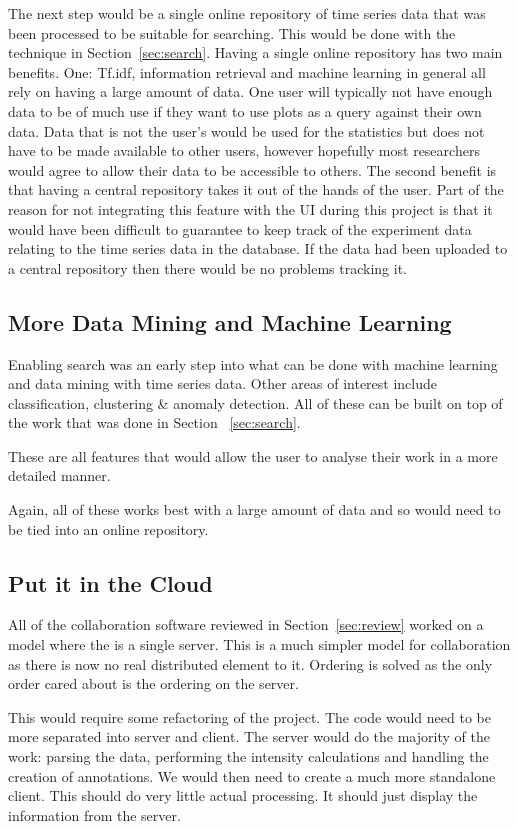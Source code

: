 The next step would be a single online repository of time series data that was been processed to be suitable for searching.  This would be done with the technique in Section~\ref{sec:search}.  Having a single online repository has two main benefits.  One: Tf.idf, information retrieval and machine learning in general all rely on having a large amount of data.  One user will typically not have enough data to be of much use if they want to use plots as a query against their own data.  Data that is not the user's would be used for the statistics but does not have to be made available to other users, however hopefully most researchers would agree to allow their data to be accessible to others.  The second benefit is that having a central repository takes it out of the hands of the user.  Part of the reason for not integrating this feature with the \ac{UI} during this project is that it would have been difficult to guarantee to keep track of the experiment data relating to the time series data in the database.  If the data had been uploaded to a central repository then there would be no problems tracking it.

\subsection{More Data Mining and Machine Learning}

Enabling search was an early step into what can be done with machine learning and data mining with time series data.  Other areas of interest include classification, clustering \& anomaly detection.  All of these can be built on top of the work that was done in Section ~\ref{sec:search}.

These are all features that would allow the user to analyse their work in a more detailed manner.

Again, all of these works best with a large amount of data and so would need to be tied into an online repository.

\subsection{Put it in the Cloud}
\label{sec:cloud}
All of the collaboration software reviewed in Section~\ref{sec:review} worked on a model where the is a single server.  This is a much simpler model for collaboration as there is now no real distributed element to it.  Ordering is solved as the only order cared about is the ordering on the server.

This would require some refactoring of the project.  The code would need to be more separated into server and client.  The server would do the majority of the work: parsing the data, performing the intensity calculations and handling the creation of annotations.  We would then need to create a much more standalone client.  This should do very little actual processing.  It should just display the information from the server.

